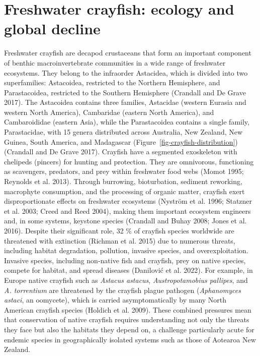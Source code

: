 \documentclass[
  12pt,
  a4paper,
  oneside]{scrbook}
\begin{document}
\section{Freshwater crayfish: ecology and global
decline}\label{freshwater-crayfish-ecology-and-global-decline}

Freshwater crayfish are decapod crustaceans that form an important
component of benthic macroinvertebrate communities in a wide range of
freshwater ecosystems. They belong to the infraorder Astacidea, which is
divided into two superfamilies: Astacoidea, restricted to the Northern
Hemisphere, and Parastacoidea, restricted to the Southern Hemisphere
(Crandall and De Grave 2017). The Astacoidea contains three families,
Astacidae (western Eurasia and western North America), Cambaridae
(eastern North America), and Cambaroididae (eastern Asia), while the
Parastacoidea contains a single family, Parastacidae, with 15 genera
distributed across Australia, New Zealand, New Guinea, South America,
and Madagascar (Figure~\ref{fig-crayfish-distribution}) (Crandall and De
Grave 2017). Crayfish have a segmented exoskeleton with chelipeds
(pincers) for hunting and protection. They are omnivorous, functioning
as scavengers, predators, and prey within freshwater food webs (Momot
1995; Reynolds et al. 2013). Through burrowing, bioturbation, sediment
reworking, macrophyte consumption, and the processing of organic matter,
crayfish exert disproportionate effects on freshwater ecosystems
(Nyström et al. 1996; Statzner et al. 2003; Creed and Reed 2004), making
them important ecosystem engineers and, in some systems, keystone
species (Crandall and Buhay 2008; Jones et al. 2016). Despite their
significant role, 32 \% of crayfish species worldwide are threatened
with extinction (Richman et al. 2015) due to numerous threats, including
habitat degradation, pollution, invasive species, and overexploitation.
Invasive species, including non-native fish and crayfish, prey on native
species, compete for habitat, and spread diseases (Danilović et al.
2022). For example, in Europe native crayfish such as \emph{Astacus
astacus}, \emph{Austropotamobius pallipes}, and \emph{A. torrentium} are
threatened by the crayfish plague pathogen (\emph{Aphanomyces astaci},
an oomycete), which is carried asymptomatically by many North American
crayfish species (Holdich et al. 2009). These combined pressures mean
that conservation of native crayfish requires understanding not only the
threats they face but also the habitats they depend on, a challenge
particularly acute for endemic species in geographically isolated
systems such as those of Aotearoa New Zealand.
\end{document}
